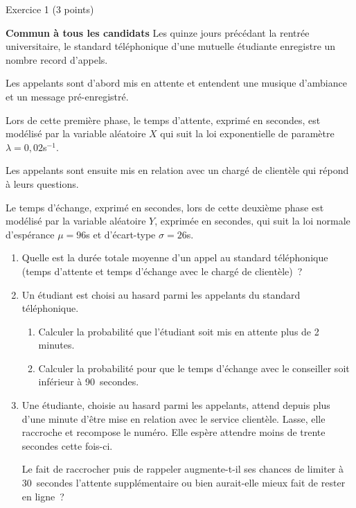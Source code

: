 
\begin{h2}Exercice 1 (3 points)\end{h2}
\textbf{Commun à  tous les candidats}
\medskip
Les quinze jours précédant la rentrée universitaire, le standard téléphonique d'une mutuelle étudiante
enregistre un nombre record d'appels.
\par
Les appelants sont d'abord mis en attente et entendent une musique d'ambiance et un message
pré-enregistré.
\par
Lors de cette première phase, le temps d'attente, exprimé en secondes, est modélisé par la variable
aléatoire $X$ qui suit la loi exponentielle de paramètre $\lambda = 0,02$s$^{-1}$.
\par
Les appelants sont ensuite mis en relation avec un chargé de clientèle qui répond à leurs questions.
\par
Le temps d'échange, exprimé en secondes, lors de cette deuxième phase est modélisé par la
variable aléatoire $Y$, exprimée en secondes, qui suit la loi normale d'espérance $\mu = 96$s et d'écart-type
$\sigma = 26$s.
\begin{enumerate}
     \item Quelle est la durée totale moyenne d'un appel au standard téléphonique (temps d'attente et
     temps d'échange avec le chargé de clientèle)~?
     \item  Un étudiant est choisi au hasard parmi les appelants du standard téléphonique.
     \begin{enumerate}[label=\alph*.]
          \item Calculer la probabilité que l'étudiant soit mis en attente plus de 2 minutes.
          \item Calculer la probabilité pour que le temps d'échange avec le conseiller soit inférieur à 90~secondes.
     \end{enumerate}
     \item  Une étudiante, choisie au hasard parmi les appelants, attend depuis plus d'une minute d'être
     mise en relation avec le service clientèle. Lasse, elle raccroche et recompose le numéro. Elle
     espère attendre moins de trente secondes cette fois-ci.
     \par
     Le fait de raccrocher puis de rappeler augmente-t-il ses chances de limiter à 30~secondes
     l'attente supplémentaire ou bien aurait-elle mieux fait de rester en ligne~?
\end{enumerate}
